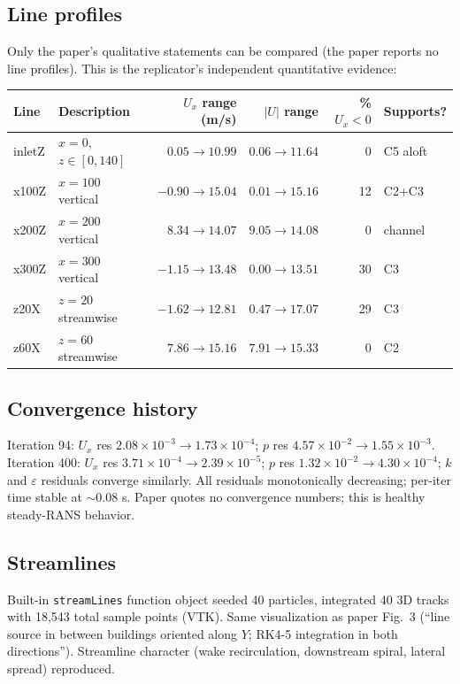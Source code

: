 \documentclass[11pt,a4paper]{article}
\begin{document}
\subsection{Line profiles}
Only the paper's qualitative statements can be compared (the paper reports no
line profiles). This is the replicator's independent quantitative evidence:
{\small
\begin{center}
\begin{tabular}{@{}llrrrl@{}}
\toprule
Line & Description & $U_x$ range (m/s) & $|U|$ range & \% $U_x{<}0$ & Supports? \\
\midrule
inletZ  & $x{=}0$, $z\in[0,140]$ & $0.05\to 10.99$ & $0.06\to 11.64$ & 0 & C5 aloft \\
x100Z   & $x{=}100$ vertical & $-0.90\to 15.04$ & $0.01\to 15.16$ & 12 & C2+C3 \\
x200Z   & $x{=}200$ vertical & $8.34\to 14.07$ & $9.05\to 14.08$ & 0 & channel \\
x300Z   & $x{=}300$ vertical & $-1.15\to 13.48$ & $0.00\to 13.51$ & 30 & C3 \\
z20X    & $z{=}20$ streamwise & $-1.62\to 12.81$ & $0.47\to 17.07$ & 29 & C3 \\
z60X    & $z{=}60$ streamwise & $\phantom{-}7.86\to 15.16$ & $7.91\to 15.33$ & 0 & C2 \\
\bottomrule
\end{tabular}
\end{center}
}

\subsection{Convergence history}
Iteration 94: $U_x$ res $2.08{\times}10^{-3}\to 1.73{\times}10^{-4}$;
$p$ res $4.57{\times}10^{-2}\to 1.55{\times}10^{-3}$.
Iteration 400: $U_x$ res $3.71{\times}10^{-4}\to 2.39{\times}10^{-5}$;
$p$ res $1.32{\times}10^{-2}\to 4.30{\times}10^{-4}$;
$k$ and $\varepsilon$ residuals converge similarly.
All residuals monotonically decreasing; per-iter time stable at $\sim 0.08$ s.
Paper quotes no convergence numbers; this is healthy steady-RANS behavior.

\subsection{Streamlines}
Built-in \texttt{streamLines} function object seeded 40 particles, integrated
40 3D tracks with 18{,}543 total sample points (VTK). Same visualization as
paper Fig.~3 (``line source in between buildings oriented along $Y$; RK4-5
integration in both directions''). Streamline character (wake recirculation,
downstream spiral, lateral spread) reproduced.
\end{document}
